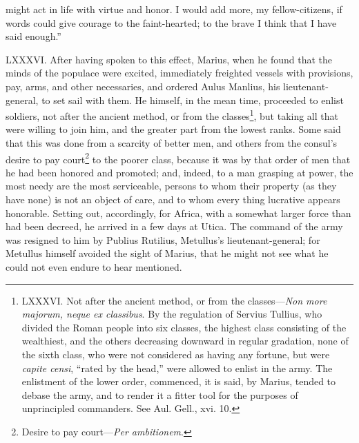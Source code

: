 might act in life with virtue and honor. I would add more, my
fellow-citizens, if words could give courage to the faint-hearted; to
the brave I think that I have said enough.''

LXXXVI. After having spoken to this effect, Marius, when he found that
the minds of the populace were excited, immediately freighted vessels
with provisions, pay, arms, and other necessaries, and ordered Aulus
Manlius, his lieutenant-general, to set sail with them. He himself, in
the mean time, proceeded to enlist soldiers, not after the ancient
method, or from the classes\footnote{LXXXVI. Not after the ancient method, or from the classes—\emph{Non
more majorum, neque ex classibus}. By the regulation of Servius Tullius,
who divided the Roman people into six classes, the highest class
consisting of the wealthiest, and the others decreasing downward in
regular gradation, none of the sixth class, who were not considered as
having any fortune, but were \emph{capite censi}, ``rated by the head,'' were
allowed to enlist in the army. The enlistment of the lower order,
commenced, it is said, by Marius, tended to debase the army, and to
render it a fitter tool for the purposes of unprincipled commanders.
See Aul. Gell., xvi. 10.}, but taking all that were willing to
join him, and the greater part from the lowest ranks. Some said that
this was done from a scarcity of better men, and others from the
consul's desire to pay court\footnote{Desire to pay court—\emph{Per ambitionem}.} to the poorer class, because it was
by that order of men that he had been honored and promoted; and,
indeed, to a man grasping at power, the most needy are the most
serviceable, persons to whom their property (as they have none) is not
an object of care, and to whom every thing lucrative appears honorable.
Setting out, accordingly, for Africa, with a somewhat larger force than
had been decreed, he arrived in a few days at Utica. The command of the
army was resigned to him by Publius Rutilius, Metullus's
lieutenant-general; for Metullus himself avoided the sight of Marius,
that he might not see what he could not even endure to hear mentioned.

